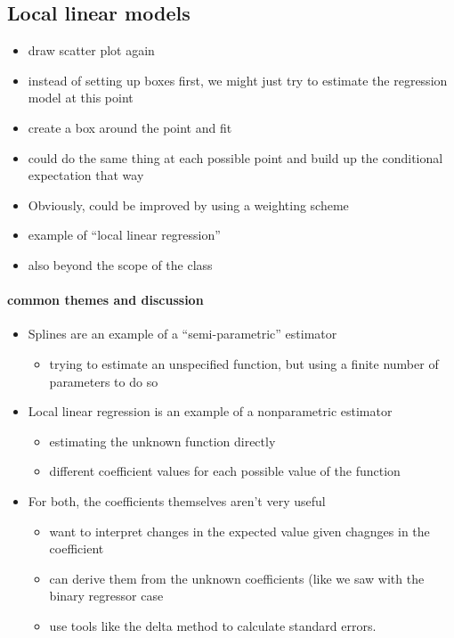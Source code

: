 \subsection{Local linear models}

\begin{itemize}
\item draw scatter plot again
\item instead of setting up boxes first, we might just try to
        estimate the regression model at this point
\item create a box around the point and fit
\item could do the same thing at each possible point and build up
        the conditional expectation that way
\item Obviously, could be improved by using a weighting scheme
\item example of ``local linear regression''
\item also beyond the scope of the class
\end{itemize}

\paragraph{common themes and discussion}
\begin{itemize}
\item Splines are an example of a ``semi-parametric'' estimator
\begin{itemize}
\item trying to estimate an unspecified function, but using a
          finite number of parameters to do so
\end{itemize}
\item Local linear regression is an example of a nonparametric estimator
\begin{itemize}
\item estimating the unknown function directly
\item different coefficient values for each possible value of the
          function
\end{itemize}
\item For both, the coefficients themselves aren't very useful
\begin{itemize}
\item want to interpret changes in the expected value given
          chagnges in the coefficient
\item can derive them from the unknown coefficients (like we saw
          with the binary regressor case
\item use tools like the delta method to calculate standard errors.
\end{itemize}
\end{itemize}

